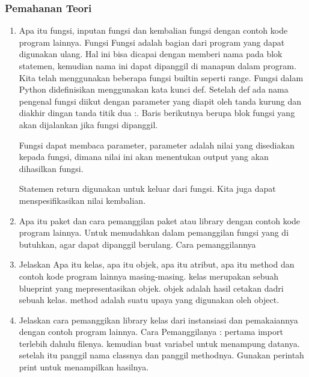 \subsubsection{Pemahanan Teori}
\begin{enumerate}
    \item Apa itu fungsi, inputan fungsi dan kembalian fungsi dengan contoh kode program
    lainnya.
        \subitem Fungsi Fungsi adalah bagian dari program yang dapat digunakan ulang. Hal ini bisa dicapai dengan memberi nama pada blok statemen, kemudian nama ini dapat dipanggil di manapun dalam program. Kita telah menggunakan beberapa fungsi builtin seperti range. Fungsi dalam Python didefinisikan menggunakan kata kunci def. Setelah def ada nama pengenal fungsi diikut dengan parameter yang diapit oleh tanda kurung dan diakhir dingan tanda titik dua :. Baris berikutnya berupa blok fungsi yang akan dijalankan jika fungsi dipanggil.
        

        \subitem Fungsi dapat membaca parameter, parameter adalah nilai yang disediakan kepada fungsi, dimana nilai ini akan menentukan output yang akan dihasilkan fungsi.
        

        \subitem Statemen return digunakan untuk keluar dari fungsi. Kita juga dapat menspesifikasikan nilai kembalian.
        

    \item Apa itu paket dan cara pemanggilan paket atau library dengan contoh kode
    program lainnya.
        \subitem Untuk memudahkan dalam pemanggilan fungsi yang di butuhkan, agar dapat dipanggil berulang.
    Cara pemanggilannya
    

    \item Jelaskan Apa itu kelas, apa itu objek, apa itu atribut, apa itu method dan contoh kode program lainnya masing-masing.
    kelas merupakan sebuah blueprint yang mepresentasikan objek.
    objek adalah hasil cetakan dadri sebuah kelas.
    method adalah suatu upaya yang digunakan oleh object.
    

    \item Jelaskan cara pemanggikan library kelas dari instansiasi dan pemakaiannya dengan contoh program lainnya.
    Cara Pemanggilanya :
        \subitem pertama import terlebih dahulu filenya.
        \subitem kemudian buat variabel untuk menampung datanya.
        \subitem setelah itu panggil nama classnya dan panggil methodnya.
        \subitem Gunakan perintah print untuk menampilkan hasilnya.
      


\end{enumerate}
